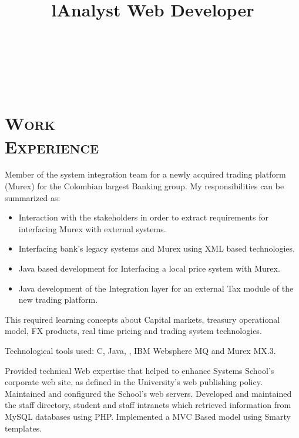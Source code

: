 \begin{resume}
\begin{formatb}
  \title{l}\\
 \\
  \body\\
\end{formatb}

\section{\textsc{Work\\ Experience}}

\title{\textbf{Analyst} }
\begin{position}
Member of the system integration team for a newly acquired  trading
platform (Murex) for the Colombian largest Banking group. 
My responsibilities can be summarized as:
\begin{itemize}
\item {Interaction with the stakeholders in order to extract requirements for interfacing Murex with external systems.}
\item {Interfacing bank's legacy systems and Murex using XML based technologies.}
\item {Java  based development for Interfacing  a local price system  with Murex.}
\item {Java development of the Integration layer for an external Tax module of the new trading platform.}
\end{itemize} 

This required learning concepts about  Capital markets, treasury operational model, FX products, real time
pricing and trading system technologies.

Technological tools used:
C, Java, \CSharp, IBM  Websphere MQ and Murex MX.3.

\end{position}


\title{\textbf{Web Developer} }
\begin{position}
Provided technical Web expertise that helped to enhance Systems School's corporate web site, 
as defined in the University's web publishing policy. Maintained and
configured the School's web servers. Developed and maintained the
staff directory, student and staff intranets which retrieved
information from MySQL databases using PHP. Implemented a MVC Based
model using Smarty templates.
\end{position}


\end{resume}
